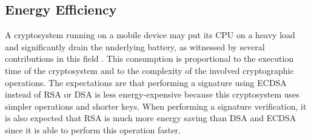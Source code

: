 \documentclass[authoryear]{elsarticle}
\begin{document}




\subsection{Energy Efficiency}
A cryptosystem running on a mobile device may put its CPU on a heavy load and significantly drain the underlying battery, as witnessed by several contributions in this field \citep{Potlapally06,KimHL06,wander2005energy}. This consumption is proportional to the execution time of the cryptosystem and to the complexity of the involved cryptographic operations. The expectations are that performing a signature using ECDSA instead of RSA or DSA is less energy-expensive because this cryptosystem uses simpler operations and shorter keys. When performing a signature verification, it is also expected that RSA is much more energy saving than DSA and ECDSA since it is able to perform this operation faster.
\end{document}
